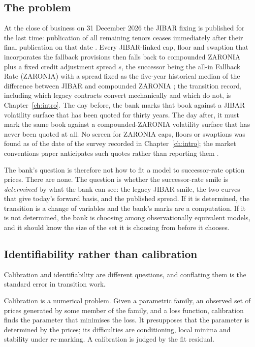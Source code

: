 \documentclass[../../../main.tex]{subfiles}
\begin{document}
\subsection{The problem}

At the close of business on 31 December 2026 the JIBAR fixing is published for the last time: publication of all remaining tenors ceases immediately after their final publication on that date \citep[p.~1]{isda2025}. Every JIBAR-linked cap, floor and swaption that incorporates the fallback provisions then falls back to compounded ZARONIA plus a fixed credit adjustment spread $s$, the successor being the all-in Fallback Rate (ZARONIA) with a spread fixed as the five-year historical median of the difference between JIBAR and compounded ZARONIA \citep[Sects.~2 and~4]{isda2025}; the transition record, including which legacy contracts convert mechanically and which do not, is Chapter~\ref{ch:intro}. The day before, the bank marks that book against a JIBAR volatility surface that has been quoted for thirty years. The day after, it must mark the same book against a compounded-ZARONIA volatility surface that has never been quoted at all. No screen for ZARONIA caps, floors or swaptions was found as of the date of the survey recorded in Chapter~\ref{ch:intro}; the market conventions paper anticipates such quotes rather than reporting them \citep[\S8, p.~26]{sarb2024conv}.

The bank's question is therefore not how to fit a model to successor-rate option prices. There are none. The question is whether the successor-rate smile is \emph{determined} by what the bank can see: the legacy JIBAR smile, the two curves that give today's forward basis, and the published spread. If it is determined, the transition is a change of variables and the bank's marks are a computation. If it is not determined, the bank is choosing among observationally equivalent models, and it should know the size of the set it is choosing from before it chooses.

\subsection{Identifiability rather than calibration}

Calibration and identifiability are different questions, and conflating them is the standard error in transition work.

Calibration is a numerical problem. Given a parametric family, an observed set of prices generated by some member of the family, and a loss function, calibration finds the parameter that minimises the loss. It presupposes that the parameter is determined by the prices; its difficulties are conditioning, local minima and stability under re-marking. A calibration is judged by the fit residual.
\end{document}
